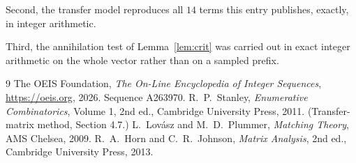 \documentclass[11pt,a4paper]{article}
\theoremstyle{plain}
\theoremstyle{definition}
\begin{document}
Second, the transfer model reproduces all $14$ terms this entry publishes, exactly, in
integer arithmetic.

Third, the annihilation test of Lemma~\ref{lem:crit} was carried out in exact integer
arithmetic on the whole vector rather than on a sampled prefix.

\begin{thebibliography}{9}
 The OEIS Foundation, \emph{The On-Line Encyclopedia of Integer
Sequences}, \url{https://oeis.org}, 2026. Sequence A263970.
 R.~P.~Stanley, \emph{Enumerative Combinatorics}, Volume 1, 2nd ed.,
Cambridge University Press, 2011. (Transfer-matrix method, Section 4.7.)
 L.~Lov\'asz and M.~D.~Plummer, \emph{Matching Theory}, AMS Chelsea, 2009.
 R.~A.~Horn and C.~R.~Johnson, \emph{Matrix Analysis}, 2nd ed., Cambridge
University Press, 2013.
\end{thebibliography}
\end{document}
